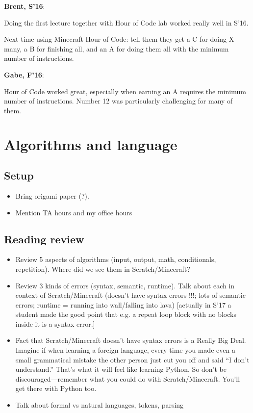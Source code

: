 \documentclass{article}
\newenvironment{reflect}[1]
{
  \noindent
  \begin{lrbox}{\reflectbox}
    \begin{minipage}[t]{\textwidth}
      \textbf{#1}:
}{
    \end{minipage}
  \end{lrbox}
  \fbox{\usebox{\reflectbox}}
}
\begin{document}
\begin{reflect}{Brent, S'16}
  Doing the first lecture together with Hour of Code lab worked really
  well in S'16.

  Next time using Minecraft Hour of Code: tell them they get a C for
  doing X many, a B for finishing all, and an A for doing them all
  with the minimum number of instructions.
\end{reflect}

\begin{reflect}{Gabe, F'16}
Hour of Code worked great, especially when earning an A requires the minimum number of instructions. Number 12 was particularly challenging for many of them.
\end{reflect}

\newpage

\section{Algorithms and language}

\subsection*{Setup}

\begin{itemize}
\item Bring origami paper (?).
\item Mention TA hours and my office hours
\end{itemize}

\subsection*{Reading review}

\begin{itemize}
\item Review 5 aspects of algorithms (input, output, math,
  conditionals, repetition).  Where did we see them in
  Scratch/Minecraft?
\item Review 3 kinds of errors (syntax, semantic, runtime).  Talk
  about each in context of Scratch/Minecraft (doesn't have syntax
  errors !!!; lots of semantic errors; runtime = running into
  wall/falling into lava) [actually in S'17 a student made the good
  point that e.g. a repeat loop block with no blocks inside it is a
  syntax error.]
\item Fact that Scratch/Minecraft doesn't have syntax errors is a
  Really Big Deal.  Imagine if when learning a foreign language, every
  time you made even a small grammatical mistake the other person just
  cut you off and said ``I don't understand.''  That's what it will
  feel like learning Python.  So don't be discouraged---remember what
  you could do with Scratch/Minecraft.  You'll get there with Python
  too.
\item Talk about formal vs natural languages, tokens, parsing
\end{itemize}
\end{document}
